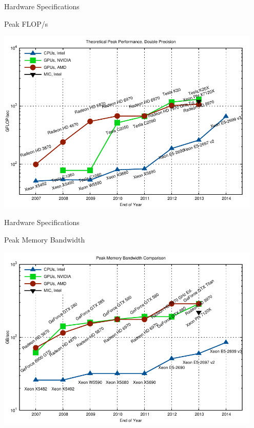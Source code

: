 



\begin{frame}{Hardware Specifications}
 \begin{block}{Peak FLOP/s} \end{block}
 \begin{center} \vspace*{-0.9cm} \includegraphics[width=0.95\textwidth]{figures/gflops-dp} \end{center}
\end{frame}

\begin{frame}{Hardware Specifications}
 \begin{block}{Peak Memory Bandwidth} \end{block}
 \begin{center} \vspace*{-0.9cm} \includegraphics[width=0.95\textwidth]{figures/mem-bw} \end{center}
\end{frame}

